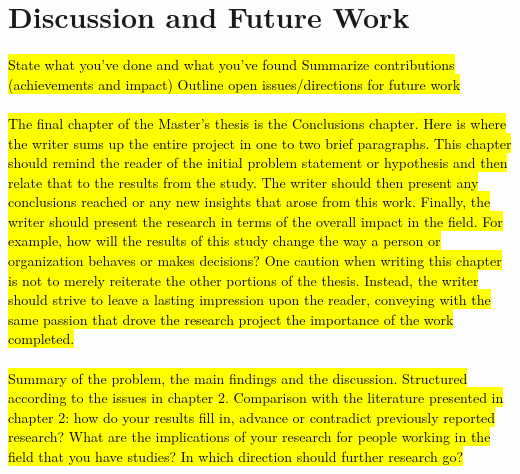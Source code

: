 \newpage
\section{Discussion and Future Work}

\hl{State what you've done and what you've found
Summarize contributions (achievements and impact)
Outline open issues/directions for future work
\\\\
The final chapter of the Master's thesis is the Conclusions chapter. Here is where the writer sums up the entire project in one to two brief paragraphs. This chapter should remind the reader of the initial problem statement or hypothesis and then relate that to the results from the study. The writer should then present any conclusions reached or any new insights that arose from this work.  Finally, the writer should present the research in terms of the overall impact in the field. For example, how will the results of this study change the way a person or organization behaves or makes decisions? One caution when writing this chapter is not to merely reiterate the other portions of the thesis. Instead, the writer should strive to leave a lasting impression upon the reader, conveying with the same passion that drove the research project the importance of the work completed.
\\\\
Summary of the problem, the main findings and the discussion. Structured according to the issues in chapter 2.
Comparison with the literature presented in chapter 2: how do your results fill in, advance or contradict previously reported research?
What are the implications of your research for people working in the field that you have studies? In which direction should further research go? }
